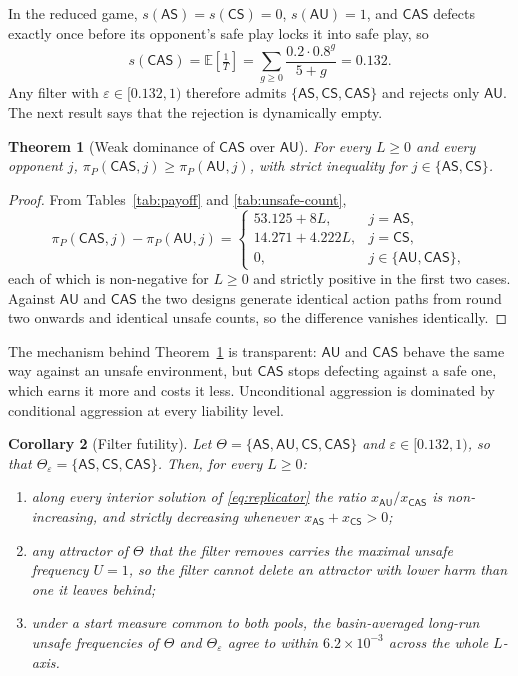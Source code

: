\documentclass[pdflatex]{sn-jnl}
\theoremstyle{thmstyleone}
\newtheorem{theorem}{Theorem}
\newtheorem{corollary}[theorem]{Corollary}
\theoremstyle{thmstylethree}
\theoremstyle{thmstyletwo}
\newcommand{\AS}{\textsf{AS}}
\newcommand{\AU}{\textsf{AU}}
\newcommand{\CS}{\textsf{CS}}
\newcommand{\CAS}{\textsf{CAS}}
\newcommand{\piP}{\pi_{P}}
\begin{document}
In the reduced game, $s(\AS)=s(\CS)=0$, $s(\AU)=1$, and $\CAS$ defects exactly
once before its opponent's safe play locks it into safe play, so
\begin{equation}
s(\CAS)=\mathbb{E}\!\left[\tfrac{1}{T}\right]
=\sum_{g\ge 0}\frac{0.2\cdot 0.8^{g}}{5+g}=0.132 .
\label{eq:solo}
\end{equation}
Any filter with $\varepsilon\in[0.132,1)$ therefore admits $\{\AS,\CS,\CAS\}$
and rejects only $\AU$. The next result says that the rejection is
dynamically empty.

\begin{theorem}[Weak dominance of $\CAS$ over $\AU$]\label{thm:dominance}
For every $L\ge 0$ and every opponent $j$, $\piP(\CAS,j)\ge\piP(\AU,j)$, with
strict inequality for $j\in\{\AS,\CS\}$.
\end{theorem}

\begin{proof}
From Tables~\ref{tab:payoff} and \ref{tab:unsafe-count},
\begin{equation}
\piP(\CAS,j)-\piP(\AU,j)=
\begin{cases}
53.125+8L, & j=\AS,\\
14.271+4.222L, & j=\CS,\\
0, & j\in\{\AU,\CAS\},
\end{cases}
\label{eq:dominance}
\end{equation}
each of which is non-negative for $L\ge0$ and strictly positive in the first
two cases. Against $\AU$ and $\CAS$ the two designs generate identical action
paths from round two onwards and identical unsafe counts, so the difference
vanishes identically.
\end{proof}

The mechanism behind Theorem~\ref{thm:dominance} is transparent: $\AU$ and
$\CAS$ behave the same way against an unsafe environment, but $\CAS$ stops
defecting against a safe one, which earns it more and costs it less.
Unconditional aggression is dominated by conditional aggression at every
liability level.

\begin{corollary}[Filter futility]\label{cor:filter}
Let $\Theta=\{\AS,\AU,\CS,\CAS\}$ and $\varepsilon\in[0.132,1)$, so that
$\Theta_{\varepsilon}=\{\AS,\CS,\CAS\}$. Then, for every $L\ge 0$:
\begin{enumerate}
\item[(i)] along every interior solution of \eqref{eq:replicator} the ratio
$x_{\AU}/x_{\CAS}$ is non-increasing, and strictly decreasing whenever
$x_{\AS}+x_{\CS}>0$;
\item[(ii)] any attractor of $\Theta$ that the filter removes carries the
maximal unsafe frequency $U=1$, so the filter cannot delete an attractor with
lower harm than one it leaves behind;
\item[(iii)] under a start measure common to both pools, the basin-averaged
long-run unsafe frequencies of $\Theta$ and $\Theta_{\varepsilon}$ agree to
within $6.2\times10^{-3}$ across the whole $L$-axis.
\end{enumerate}
\end{corollary}
\end{document}
